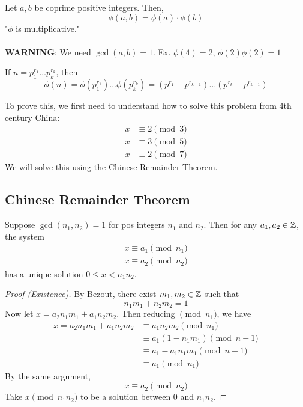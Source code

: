         \begin{theorem}
            Let $a,b$ be coprime positive integers. Then,
            \[ \phi(a,b)=\phi(a)\cdot\phi(b) \]
            "$\phi$ is multiplicative." \\\\
            \textbf{WARNING}: We need $\gcd(a,b)=1$.
            Ex. $\phi(4)=2$, $\phi(2)\phi(2)=1$
        \end{theorem}

        \begin{corollary}
            If $n=p_1^{r_1}\dots p_k^{r_k}$, then
            \[ 
                \phi(n) = \phi(p_1^{r_1})\dots\phi(p_k^{r_k})
                = (p^{r_1}-p^{r_{k-1}})\dots(p^{r_k}-p^{r_{k-1}})
            \]
        \end{corollary}

        To prove this, we first need to understand how to solve this 
        problem from 4th century China: 
        \begin{align*}
            x &\equiv 2\pmod{3} \\
            x &\equiv 3\pmod{5} \\
            x &\equiv 2\pmod{7}
        \end{align*}
        We will solve this using the \underline{Chinese Remainder Theorem}.

        \subsection{Chinese Remainder Theorem}
        \begin{theorem} 
            Suppose $\gcd(n_1,n_2)=1$ for pos integers $n_1$ and $n_2$. 
            Then for any $a_1,a_2\in\mathbb{Z}$, the system
            \begin{align*}
                x\equiv a_1\pmod{n_1} \\
                x\equiv a_2\pmod{n_2}
            \end{align*} 
            has a unique solution $0\le x<n_1n_2$.

            \begin{proof} [Proof (Existence)]
                By Bezout, there exist $m_1,m_2\in\mathbb{Z}$ such that
                \[ n_1m_1+n_2m_2 = 1 \]
                Now let $x=a_2n_1m_1+a_1n_2m_2$.
                Then reducing $\pmod{n_1}$, we have
                \begin{align*}
                    x=a_2n_1m_1+a_1n_2m_2 &\equiv a_1n_2m_2\pmod{n_1} \\
                    &\equiv a_1(1-n_1m_1)\pmod{n-1} \\
                    &\equiv a_1-a_1n_1m_1\pmod{n-1} \\
                    &\equiv a_1\pmod{n_1}
                \end{align*}
                By the same argument, 
                \[ x\equiv a_2\pmod{n_2} \]
                Take $x\pmod{n_1n_2}$ to be a solution between 0 and $n_1n_2$.
            \end{proof}
        \end{theorem}

